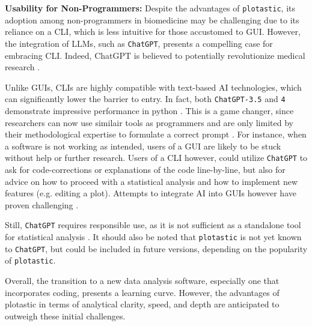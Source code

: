 \textbf{Usability for Non-Programmers:}
Despite the advantages of \texttt{plotastic}, its adoption among non-programmers
in biomedicine may be challenging due to its reliance on a \ac{CLI}, which is
less intuitive for those accustomed to \ac{GUI}. However, the integration of
\acp{LLM}, such as \texttt{ChatGPT}, presents a compelling case for embracing CLI.
Indeed, ChatGPT is believed to potentially revolutionize medical research
\cite{ruksakulpiwatUsingChatGPTMedical2023}.

Unlike GUIs, CLIs are highly compatible with text-based AI technologies, which
can significantly lower the barrier to entry. In fact, both \texttt{ChatGPT-3.5}
and \texttt{4} demonstrate impressive performance in python
\cite{arefinUnmaskingGiantComprehensive2023}. This is a game changer, since
researchers can now use similair tools as programmers and are only limited by
their methodological expertise to formulate a correct prompt
\cite{qureshiAreChatGPTLarge2023}. For instance, when a software is not
working as intended, users of a GUI are likely to be stuck without help or
further research. Users of a CLI however, could utilize \texttt{ChatGPT} to ask for
code-corrections or explanations of the code line-by-line, but also for advice
on how to proceed with a statistical analysis and how to implement new features
(e.g. editing a plot). Attempts to integrate AI into GUIs however have proven
challenging \cite{gaoASSISTGUITaskOrientedDesktop2024}.

Still, \texttt{ChatGPT} requires responsible use, as it is not sufficient as a standalone
tool for statistical analysis \cite{ordakChatGPTSkillsStatistical2023}. It
should also be noted that \texttt{plotastic} is not yet known to \texttt{ChatGPT}, but
could be included in future versions, depending on the popularity of
\texttt{plotastic}.

Overall, the transition to a new data analysis software, especially one
that incorporates coding, presents a learning curve. However, the advantages of
plotastic in terms of analytical clarity, speed, and depth are anticipated to
outweigh these initial challenges.


